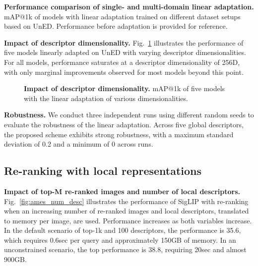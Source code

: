 \begin{table}[t]
  \centering
  \scalebox{0.87}{
    
  }
  \vspace{-5pt}
  \caption{\textbf{Performance comparison of single- and multi-domain linear adaptation.} mAP@1k of models with linear adaptation trained on different dataset setups based on UnED. Performance before adaptation is provided for reference.
  \vspace{-5pt}
  \label{tab:uned_subdomains}}
\end{table}

\noindent\textbf{Impact of descriptor dimensionality.}
Fig.~\ref{fig:descriptor_dimensionality} illustrates the performance of five models linearly adapted on UnED with varying descriptor dimensionalities. For all models, performance saturates at a descriptor dimensionality of 256D, with only marginal improvements observed for most models beyond this point.


\begin{figure}[t]
    \centering
    \vspace{-12pt}
    
    \vspace{-11pt}
    \caption{\textbf{Impact of descriptor dimensionality.} mAP@1k of five models with the linear adaptation of various dimensionalities.
    \label{fig:descriptor_dimensionality}
    \vspace{-15pt}
    }
\end{figure}

\noindent\textbf{Robustness.} 
We conduct three independent runs using different random seeds to evaluate the robustness of the linear adaptation. 
Across five global descriptors, the proposed scheme exhibits strong robustness, with a maximum standard deviation of 0.2 and a minimum of 0 across runs.


\subsection{Re-ranking with local representations}

\noindent\textbf{Impact of top-M re-ranked images and number of local descriptors.}
Fig.~\ref{fig:ames_num_desc} illustrates the performance of SigLIP with re-ranking when an increasing number of re-ranked images and local descriptors, translated to memory per image, are used. Performance increases as both variables increase. In the default scenario of top-1k and 100 descriptors, the performance is 35.6, which requires 0.6sec per query and approximately 150GB of memory. In an unconstrained scenario, the top performance is 38.8, requiring 20sec and almost 900GB.

